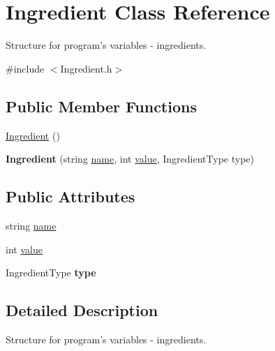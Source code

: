 \hypertarget{classIngredient}{\section{Ingredient Class Reference}
\label{classIngredient}
}


Structure for program's variables -\/ ingredients.  




{\ttfamily \#include $<$Ingredient.\-h$>$}

\subsection*{Public Member Functions}
\begin{DoxyCompactItemize}
\item 
\hyperlink{classIngredient_a738111e26d0765aabc92ebc036fad1d3}{Ingredient} ()
\item 
\hypertarget{classIngredient_af3acf81df28510c184f1f974f96c1471}{{\bfseries Ingredient} (string \hyperlink{classIngredient_a3fc00c5a7606e8e834d744676e38cdea}{name}, int \hyperlink{classIngredient_aa95e40564ad71f9ec536fb8d3fa3b839}{value}, Ingredient\-Type type)}\label{classIngredient_af3acf81df28510c184f1f974f96c1471}

\end{DoxyCompactItemize}
\subsection*{Public Attributes}
\begin{DoxyCompactItemize}
\item 
string \hyperlink{classIngredient_a3fc00c5a7606e8e834d744676e38cdea}{name}
\item 
int \hyperlink{classIngredient_aa95e40564ad71f9ec536fb8d3fa3b839}{value}
\item 
\hypertarget{classIngredient_a29a400e987a68bd02363b30b52e89710}{Ingredient\-Type {\bfseries type}}\label{classIngredient_a29a400e987a68bd02363b30b52e89710}

\end{DoxyCompactItemize}


\subsection{Detailed Description}
Structure for program's variables -\/ ingredients. 

